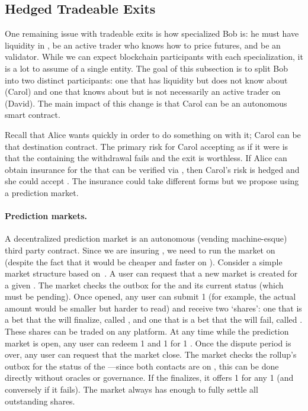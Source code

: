 \subsection{Hedged Tradeable Exits}
\label{sec:PM}

One remaining issue with tradeable exits is how specialized Bob is: he must have liquidity in \ethone, be an active trader who knows how to price futures, and be an \layertwo validator. While we can expect blockchain participants with each specialization, it is a lot to assume of a single entity. The goal of this subsection is to split Bob into two distinct participants: one that has \ethone liquidity but does not know about \layertwo (Carol) and one that knows about \layertwo but is not necessarily an active trader on \layerone (David). The main impact of this change is that Carol can be an autonomous \layerone smart contract. 

Recall that Alice wants \ethone quickly in order to do something on \layerone with it; Carol can be that destination contract. The primary risk for Carol accepting \ethxx as if it were \ethone is that the \rblock containing the \ethxx withdrawal fails and the exit is worthless. If Alice can obtain insurance for the \ethxx that can be verified via \layerone, then Carol's risk is hedged and she could accept \ethxx. The insurance could take different forms but we propose using a prediction market.

\paragraph*{Prediction markets.} A decentralized prediction market is an autonomous (\eg vending machine-esque) third party contract. Since we are insuring \layerone \ethxx, we need to run the market on \layerone (despite the fact that it would be cheaper and faster on \layertwo). Consider a simple market structure based on~\cite{clark2014decentralizing}. A user can request that a new market is created for a given \rblock. The market checks the outbox for the \rblock and its current status (which must be pending). Once opened, any user can submit 1 \ethone (for example, the actual amount would be smaller but harder to read) and receive two `shares': one that is a bet that the \rblock will finalize, called \final, and one that is a bet that the \rblock will fail, called \fail. These shares can be traded on any platform. At any time while the prediction market is open, any user can redeem 1 \final and 1 \fail for 1 \ethone. Once the dispute period is over, any user can request that the market close. The market checks the rollup's outbox for the status of the \rblock---since both contacts are on \layerone, this can be done directly without oracles or governance. If the \rblock finalizes, it offers 1 \ethone for any 1 \final (and conversely if it fails). The market always has enough \ethone to fully settle all outstanding shares.

